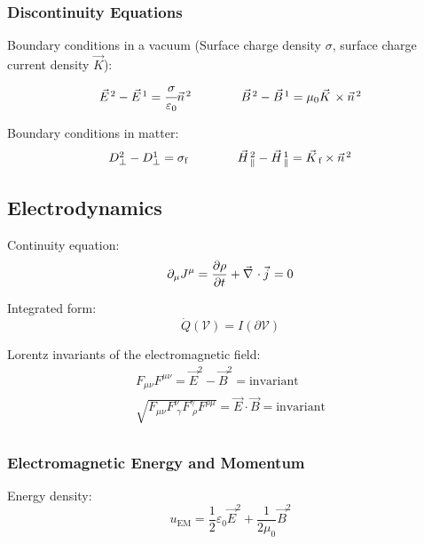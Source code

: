 		\subsubsection{Discontinuity Equations}
			\noindent
			Boundary conditions in a vacuum (Surface charge density $\sigma$, surface charge current density $\vec{K}$):
		\begin{equation}
		\begin{array}{cc}
			\vec{E}^2 - \vec{E}^1 = \cfrac{\sigma}{\varepsilon_0}\Vec{n}^2
			&\hsp \vec{B}^2 - \vec{B}^1 = \mu_0\vec{K}\times\Vec{n}^2
		\end{array}
		\end{equation}

			\noindent
			Boundary conditions in matter:
		\begin{equation}
		\begin{array}{cc}
			D_\perp^2 - D_\perp^1 = \sigma_\text{f}
			&\hsp \vec{H}_\parallel^2 - \vec{H}_\parallel^1 = \vec{K}_\text{f}\times\Vec{n}^2
		\end{array}
		\end{equation}

	\subsection{Electrodynamics}
		\noindent
		Continuity equation:
		\begin{equation}
			\partial_\mu J^\mu = \pdv{\rho}{t} + \Nabla\cdot\vec{j} = 0
		\end{equation}

		\noindent
		Integrated form:
		\begin{equation}
			\dot{Q}(\mathcal{V}) = I(\partial\mathcal{V})
		\end{equation}

		\noindent
		Lorentz invariants of the electromagnetic field:
		\begin{equation}
			\begin{aligned}
				F_{\mu\nu} F^{\mu\nu} = \vec{E}^2 - \vec{B}^2 = \mathrm{invariant} \\
				\sqrt{ F_{\mu\nu} F^{\nu}_{\;\gamma} F^{\gamma}_{\;\rho} F^{\rho\mu}} = \vec{E}\cdot \vec{B} = \mathrm{invariant} \\
			\end{aligned}
		\end{equation}

		\subsubsection{Electromagnetic Energy and Momentum}
			\noindent
			Energy density:
			\begin{equation}
				u_{\text{EM}}=\frac{1}{2}\varepsilon_0 \vec{E}^2+\frac{1}{2\mu_0}\vec{B}^2
			\end{equation}

